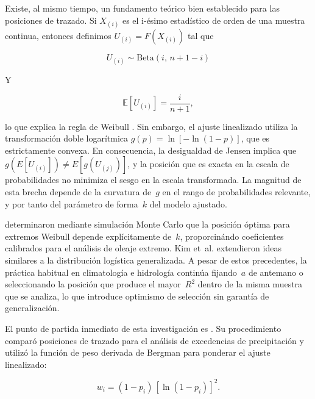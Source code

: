 \documentclass[APA,STIX1COL]{WileyNJD-v2}
\begin{document}
{Existe, al mismo tiempo, un fundamento te\'orico bien establecido
para las posiciones de trazado. Si $X_{(i)}$ es el i-ésimo estadístico de orden de una muestra continua, entonces definimos $U_{(i)}=F(X_{(i)})$ tal que 

\begin{equation*}
    U_{(i)}\sim\mathrm{Beta}(i,\,n+1-i)
\end{equation*}

Y 

\begin{equation}
    \mathbb{E}[U_{(i)}]=\dfrac{i}{n+1}, 
\end{equation}

\medskip

lo que explica la regla de Weibull
\citep{makkonen2014}. Sin embargo, el ajuste linealizado utiliza la
transformaci\'on doble logar\'itmica $g(p)=\ln[-\ln(1-p)]$, que es
estrictamente convexa. En consecuencia, la desigualdad de Jensen
implica que $g(E[U_{(i)}])\neq E[g(U_{(j)})]$, y la posici\'on
que es exacta en la escala de probabilidades no minimiza el sesgo
en la escala transformada. La magnitud de esta brecha depende de
la curvatura de~$g$ en el rango de probabilidades relevante, y
por tanto del par\'ametro de forma~$k$ del modelo ajustado.

\citet{goda1988,goda2010} determinaron mediante simulaci\'on Monte
Carlo que la posici\'on \'optima para extremos Weibull depende
expl\'icitamente de~$k$, proporcin\'ando coeficientes calibrados
para el an\'alisis de oleaje extremo. Kim et~al.
\citeyearpar{kim2012,kim2015} extendieron ideas similares a la
distribuci\'on log\'istica generalizada. A pesar de estos
precedentes, la pr\'actica habitual en climatolog\'ia e hidrolog\'ia
contin\'ua fijando~$a$ de antemano o seleccionando la posici\'on
que produce el mayor~$R^2$ dentro de la misma muestra que se analiza,
lo que introduce optimismo de selecci\'on sin garant\'ia de
generalizaci\'on.

El punto de partida inmediato de esta investigaci\'on es
\citet{olivera2019}. Su procedimiento compar\'o posiciones de
trazado para el an\'alisis de excedencias de precipitaci\'on y
utiliz\'o la funci\'on de peso derivada de Bergman
\citeyearpar{bergman1986} para ponderar el ajuste linealizado:

\begin{equation}\label{eq:bergman_intro}
w_i = (1 - p_i)\,[\ln(1-p_i)]^2.
\end{equation}

\medskip

}
\end{document}
